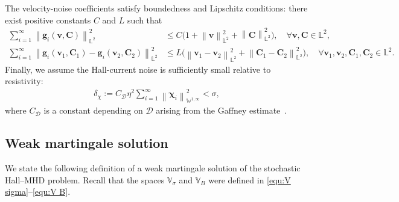 \documentclass[11pt, reqno]{amsart}
\theoremstyle{definition}
\numberwithin{equation}{section}
\newcommand{\bff}{\boldsymbol}
\newcommand{\bb}{\mathbb}
\newcommand{\norm}[2]{\left\|{#1}\right\|_{#2}}
\begin{document}
The velocity-noise coefficients satisfy boundedness and Lipschitz conditions: there exist positive constants $C$ and $L$ such that
\begin{align}
	\label{equ:g growth}
	\sum_{i=1}^\infty \norm{\bff{g}_i(\bff{v},\bff{C})}{\bb{L}^2}^2
	&\leq
	C\bigl(1+\norm{\bff{v}}{\bb{L}^2}^2+\norm{\bff{C}}{\bb{L}^2}^2\bigr), \quad \forall \bff{v},\bff{C}\in \bb{L}^2,
	\\
	\label{equ:g lipschitz}
	\sum_{i=1}^\infty \norm{\bff{g}_i(\bff{v}_1,\bff{C}_1)-\bff{g}_i(\bff{v}_2,\bff{C}_2)}{\bb{L}^2}^2
	&\leq
	L\bigl(\norm{\bff{v}_1-\bff{v}_2}{\bb{L}^2}^2+\norm{\bff{C}_1-\bff{C}_2}{\bb{L}^2}^2\bigr),
	\quad \forall \bff{v}_1,\bff{v}_2,\bff{C}_1,\bff{C}_2\in \bb{L}^2.
\end{align}
Finally, we assume the Hall-current noise is sufficiently small relative to resistivity:
\begin{align}\label{equ:hall noise small}
	\delta_\chi:=C_{\mathscr{D}}\eta^2\sum_{i=1}^\infty \norm{\bff{\chi}_i}{\bb{W}^{1,\infty}}^2<\sigma,
\end{align}
where $C_{\mathscr{D}}$ is a constant depending on $\mathscr{D}$ arising from the Gaffney estimate~\cite{AmrBerDauGir98}.


\subsection{Weak martingale solution}
\label{subsec:weak mart sol}

We state the following definition of a weak martingale solution of the stochastic Hall--MHD problem. Recall that the spaces $\bb{V}_\sigma$ and $\bb{V}_B$ were defined in \eqref{equ:V sigma}--\eqref{equ:V B}.
\end{document}
